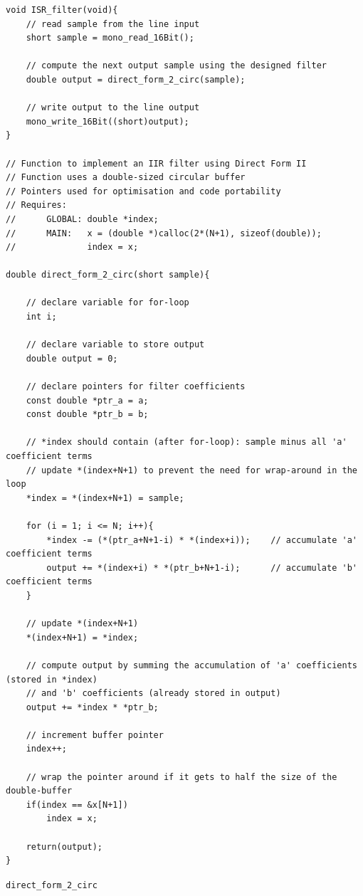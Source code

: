 \documentclass{article}
\begin{document}
\begin{listing}[H]
\begin{verbatim}
void ISR_filter(void){
    // read sample from the line input				
    short sample = mono_read_16Bit();
    
    // compute the next output sample using the designed filter
    double output = direct_form_2_circ(sample);
    
    // write output to the line output
    mono_write_16Bit((short)output);
}

// Function to implement an IIR filter using Direct Form II
// Function uses a double-sized circular buffer
// Pointers used for optimisation and code portability
// Requires:
//      GLOBAL: double *index;
//      MAIN:   x = (double *)calloc(2*(N+1), sizeof(double));
//              index = x;

double direct_form_2_circ(short sample){

    // declare variable for for-loop
    int i;
    
    // declare variable to store output
    double output = 0;
    
    // declare pointers for filter coefficients 
    const double *ptr_a = a;
    const double *ptr_b = b;
    
    // *index should contain (after for-loop): sample minus all 'a' coefficient terms
    // update *(index+N+1) to prevent the need for wrap-around in the loop
    *index = *(index+N+1) = sample;
    
    for (i = 1; i <= N; i++){
        *index -= (*(ptr_a+N+1-i) * *(index+i));    // accumulate 'a' coefficient terms
        output += *(index+i) * *(ptr_b+N+1-i);      // accumulate 'b' coefficient terms
    }
    
    // update *(index+N+1)
    *(index+N+1) = *index;
    
    // compute output by summing the accumulation of 'a' coefficients (stored in *index)
    // and 'b' coefficients (already stored in output)
    output += *index * *ptr_b;
    
    // increment buffer pointer
    index++;
    
    // wrap the pointer around if it gets to half the size of the double-buffer
    if(index == &x[N+1])
        index = x;	
    
    return(output);	
}
\end{verbatim}
\caption{{\tt direct\_form\_2\_circ}} 
\label{lst:direct_form_2_circ}
\end{listing}
\end{document}
